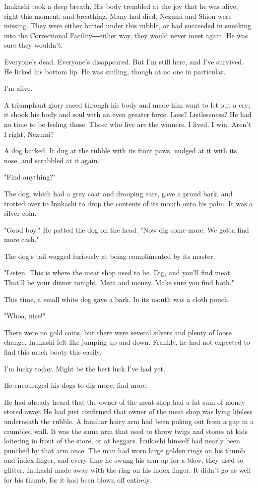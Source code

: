Inukashi took a deep breath. His body trembled at the joy that he was
alive, right this moment, and breathing. Many had died. Nezumi and Shion
were missing. They were either buried under this rubble, or had
succeeded in sneaking into the Correctional Facility―either way, they
would never meet again. He was sure they wouldn't.

Everyone's dead. Everyone's disappeared. But I'm still here, and I've
survived. He licked his bottom lip. He was smiling, though at no one in
particular.

I'm alive.

A triumphant glory raced through his body and made him want to let out a
cry; it shook his body and soul with an even greater force. Loss?
Listlessness? He had no time to be feeling those. Those who live are the
winners. I lived. I win. Aren't I right, Nezumi?

A dog barked. It dug at the rubble with its front paws, nudged at it
with its nose, and scrabbled at it again.

"Find anything?"

The dog, which had a grey coat and drooping ears, gave a proud bark, and
trotted over to Inukashi to drop the contents of its mouth onto his
palm. It was a silver coin.

"Good boy." He patted the dog on the head. "Now dig some more. We gotta
find more cash."

The dog's tail wagged furiously at being complimented by its master.

"Listen. This is where the meat shop used to be. Dig, and you'll find
meat. That'll be your dinner tonight. Meat and money. Make sure you find
both."

This time, a small white dog gave a bark. In its mouth was a cloth
pouch.

"Whoa, nice!"

There were no gold coins, but there were several silvers and plenty of
loose change. Inukashi felt like jumping up and down. Frankly, he had
not expected to find this much booty this easily.

I'm lucky today. Might be the best luck I've had yet.

He encouraged his dogs to dig more, find more.

He had already heard that the owner of the meat shop had a fat sum of
money stored away. He had just confirmed that owner of the meat shop was
lying lifeless underneath the rubble. A familiar hairy arm had been
poking out from a gap in a crumbled wall. It was the same arm that used
to throw twigs and stones at kids loitering in front of the store, or at
beggars. Inukashi himself had nearly been punched by that arm once. The
man had worn large golden rings on his thumb and index finger, and every
time he swung his arm up for a blow, they used to glitter. Inukashi made
away with the ring on his index finger. It didn't go as well for his
thumb, for it had been blown off entirely.

